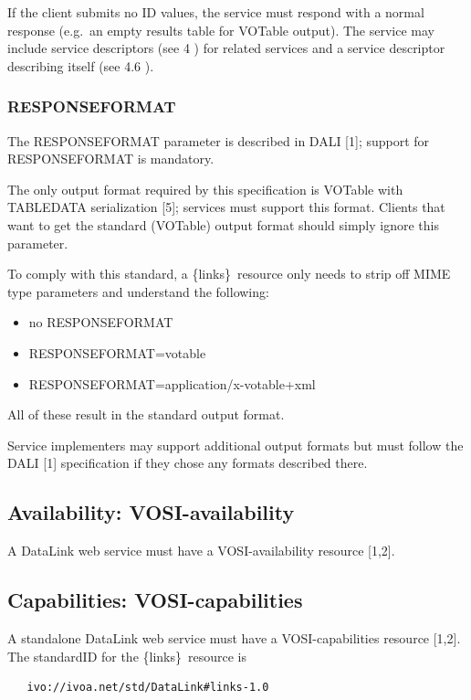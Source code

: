\documentclass[11pt,a4paper]{ivoa}
\newcommand{\blinks}{\{links\}}
\begin{document}
If the client submits no ID values, the service must respond with a
normal response (e.g.\ an empty results table for VOTable output). The
service may include service descriptors (see 4 ) for related services
and a service descriptor describing itself (see 4.6 ).


\subsubsection{RESPONSEFORMAT}

The RESPONSEFORMAT parameter is described in DALI [1];
support for RESPONSEFORMAT is mandatory.

The only output format required by this specification is VOTable with
TABLEDATA serialization [5]; services must support this format. Clients
that want to get the standard (VOTable) output format should simply
ignore this parameter.

To comply with this standard, a \blinks\ resource only needs to strip
off MIME type parameters and understand the following:
\begin{itemize}
  \item no RESPONSEFORMAT
  \item RESPONSEFORMAT=votable
  \item RESPONSEFORMAT=application/x-votable+xml
\end{itemize}
All of these result in the standard output format.

Service implementers may support additional output formats but must follow
the DALI [1] specification if they chose any formats described there.


\subsection{Availability: VOSI-availability}

A DataLink web service must have a VOSI-availability resource [1,2].


\subsection{Capabilities: VOSI-capabilities}

A standalone DataLink web service must have a
VOSI-capabilities resource [1,2].
The standardID for the \blinks\ resource is
\begin{verbatim}
   ivo://ivoa.net/std/DataLink#links-1.0
\end{verbatim}
\end{document}
